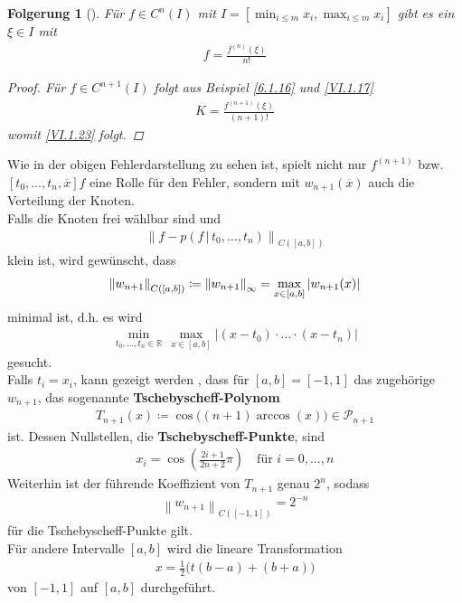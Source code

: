 \documentclass[ngerman,fontsize=11pt, paper=a4, parskip=half, titlepage=true, toc=bib]{scrbook}
\theoremstyle{definition}
\theoremstyle{plain}
\newtheorem{Fol}[Def]{Folgerung}
\newcommand{\R}{\mathds{R}}
\newcommand{\nn}[1]{\left\| #1 \right\|}	%
\newenvironment{Fole}[1][]{ %
  \begin{Fol}[#1]}
  {\end{Fol}
  	\addtocounter{subsection}{1}}
\begin{document}
\begin{Fole}
  Für $f\in C^n(I) $ mit $I=[\min_{i\leq m}x_i, \max_{i\leq m}x_i]$
gibt es ein $\xi\in I$ mit 
\begin{gather}
  [t_0,\dots,t_n]f=\frac{f^{(n)}(\xi)}{n!}
  \label{VI.1.23}
\end{gather}

\begin{proof}
  Für $f\in C^{n+1}(I)$ folgt aus
Beispiel \ref{6.1.16} und \eqref{VI.1.17}
\begin{gather*}
 K= \frac{f^{(n+1)}(\xi)}{(n+1)!}
\end{gather*}
womit \eqref{VI.1.23} folgt.
\end{proof}
\end{Fole}

Wie in der obigen Fehlerdarstellung zu sehen ist,
spielt nicht nur $f^{(n+1)}$ bzw.
$[t_0,\dots,t_n, \overline{x}]f$ eine Rolle für den Fehler,
sondern mit $w_{n+1}(\overline{x})$ auch die Verteilung der Knoten.\\
Falls die Knoten frei wählbar sind und
\begin{gather*}
  \nn{f-p(f\,|\,t_0,\dots,t_n)}_{C([a,b])}
\end{gather*}
klein ist, wird gewünscht, dass
\begin{gather*}\index{Norm}
  \nn{w_{n+1}}_{C([a,b])}\coloneqq \nn{w_{n+1}}_\infty
  = \max_{x\in[a,b]}|w_{n+1}(x)|
\end{gather*}
minimal ist, d.h.
es wird 
\begin{gather*}
  \min_{t_0,\dots,t_n\in\R}\,\max_{x\in[a,b]}
  |(x-t_0)\cdot\dots\cdot(x-t_n)|
\end{gather*}
gesucht.\\
Falls $t_i=x_i$, kann gezeigt werden 
\cite[z.B.][]{deuflhardhohmann,freundhoppe},
dass für $[a,b]=[-1,1]$ das zugehörige $w_{n+1}$,
das sogenannte
\textbf{Tschebyscheff-Polynom}
\begin{gather}
  T_{n+1}(x)\coloneqq \cos\big((n+1)\arccos(x)\big)\in\mathcal{P}_{n+1}
  \label{VI.1.24}
\end{gather}
ist. Dessen Nullstellen, die 
\textbf{Tschebyscheff-Punkte},
sind
\begin{gather}
  x_i= \cos\left(\frac{2i+1}{2n+2}\pi\right)\quad \text{für } i=0,\dots,n
  \label{VI.1.25}
\end{gather}
Weiterhin ist der führende Koeffizient von $T_{n+1}$ genau $2^n$,
sodass 
\begin{gather}
  \nn{w_{n+1}}_{C([-1,1])}=2^{-n}
  \label{VI.1.26}
\end{gather}
für die Tschebyscheff-Punkte gilt.\\
Für andere Intervalle $[a,b]$ wird die lineare Transformation
\begin{gather*}
  x=\frac{1}{2}\big(t(b-a)+(b+a)\big)
\end{gather*}
von $[-1,1]$ auf $[a,b]$ durchgeführt.
\end{document}
